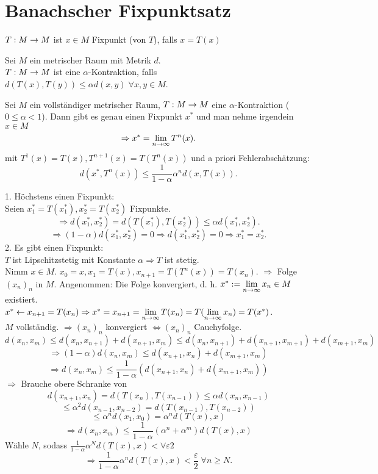 \documentclass[../ana2.tex]{subfiles}
\begin{document}
\setcounter{section}{15}
\section{Banachscher Fixpunktsatz}
\( T:M\rightarrow M \) ist \(x\in M\) Fixpunkt (von \(T\)),
falls \(x = T(x)\)
\begin{defi}
    Sei \(M\) ein metrischer Raum mit 
    Metrik \(d\).\\
    \( T:M\rightarrow M\) ist eine \( \alpha \)-Kontraktion, 
    falls \( d(T(x), T(y)) \leq \alpha d(x, y) \;\forall x, y \in M \).
\end{defi}
\begin{satz}
    Sei \( M \) ein vollständiger metrischer Raum, \( T:M\rightarrow M \) 
    eine \( \alpha \)-Kontraktion (\( 0 \leq \alpha < 1 \)). Dann gibt 
    es genau einen Fixpunkt \( x^* \) und man nehme irgendein \( x \in M \) 
    \[ \Rightarrow x^* = \lim\limits_{n\rightarrow\infty} T^n(x). \]
    mit \( T^1(x) = T(x), T^{n+1}(x) = T(T^n(x)) \)
    und a priori Fehlerabschätzung: 
    \[ d(x^*, T^n(x)) \leq \frac{1}{1-\alpha} \alpha^n d(x, T(x)). \]
\end{satz}
\begin{bew}
    1. Höchstens einen Fixpunkt:\\
    Seien \( x_1^* = T(x_1^*), x_2^* = T(x_2^*) \) Fixpunkte. 
    \[ \Rightarrow d(x_1^*, x_2^*) = d(T(x_1^*),T(x_2^*)) 
    \leq \alpha d(x_1^*, x_2^*). \]
    \[ \Rightarrow (1-\alpha) d(x_1^*, x_2^*) = 0 
    \Rightarrow d(x_1^*, x_2^*) = 0 \Rightarrow x_1^* = x_2^*. \]
    2. Es gibt einen Fixpunkt:\\
    \(T\) ist Lipschitzstetig mit Konstante \(\alpha 
    \Rightarrow T\) ist stetig.\\
    Nimm \( x \in M \). \( x_0 = x, x_1 = T(x), x_{n+1} = T(T^n(x)) 
    = T(x_n) \).
    \(\Rightarrow\) Folge \((x_n)_n\) in \(M\).
    Angenommen: Die Folge konvergiert, d. h. \( x^* := \lim\limits_{n\rightarrow\infty} x_n \in M \) 
    existiert.\\
    \( x^* \leftarrow x_{n+1} = T(x_n) \Rightarrow x^* = x_{n+1} 
    = \lim\limits_{n\rightarrow\infty} T(x_n) = T(\lim\limits_{n\rightarrow\infty}x_n) = T(x^*) \).\\
    \( M \) vollständig. \( \Rightarrow (x_n)_n \) konvergiert 
    \( \Leftrightarrow (x_n)_n \) Cauchyfolge.
    \[ d(x_n, x_m) \leq d(x_n, x_{n+1}) + d(x_{n+1}, x_m) 
    \leq d(x_n, x_{n+1}) + d(x_{n+1}, x_{m+1}) 
    + d(x_{m+1}, x_m) \]
    \[ \Rightarrow (1-\alpha) d(x_n, x_m) 
    \leq d(x_{n+1}, x_n) + d(x_{m+1}, x_m) \]
    \[ \Rightarrow d(x_n, x_m) 
    \leq \frac{1}{1-\alpha} (d(x_{n+1}, x_n) + d(x_{m+1}, x_m)) \]   
    \( \Rightarrow \) Brauche obere Schranke von 
    \[d(x_{n+1}, x_n) = d(T(x_n), T(x_{n-1})) 
    \leq \alpha d(x_n, x_{n-1}) \]
    \[ \leq \alpha^2 d(x_{n-1}, x_{n-2}) 
    = d(T(x_{n-1}), T(x_{n-2})) \]
    \[ \leq \alpha^n d(x_1, x_0) = \alpha^n d(T(x), x) \]
    \[ \Rightarrow d(x_n, x_m) \leq \frac{1}{1-\alpha}(\alpha^n + \alpha^m)d(T(x), x) \]
    Wähle \( N \), sodass \( \frac{1}{1-\alpha}\alpha^N d(T(x), x) < \forall{\varepsilon}{2} \)
    \[ \Rightarrow \frac{1}{1-\alpha} \alpha^n d(T(x), x) < \frac{\varepsilon}{2} \; \forall n \geq N. \]    
\end{bew}
\end{document}

